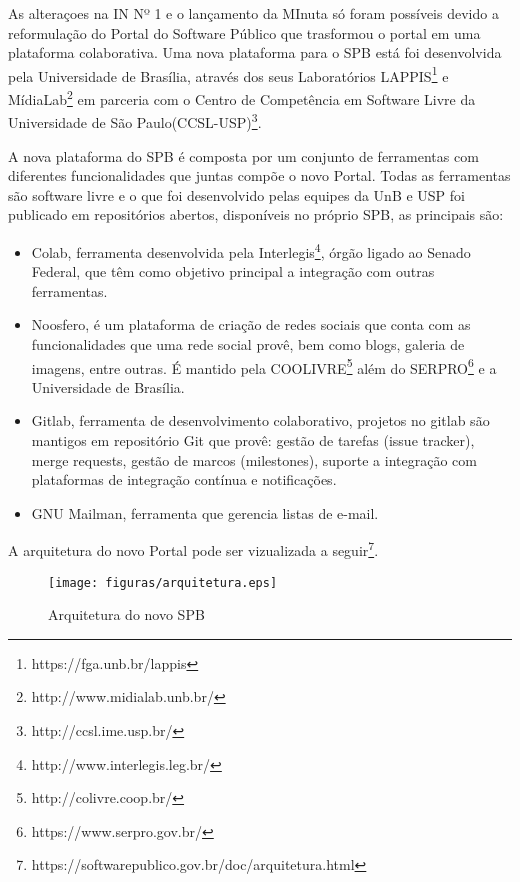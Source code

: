 As alteraçoes na IN Nº 1 e o lançamento da MInuta só foram possíveis devido 
a reformulação do Portal do Software Público que trasformou o portal em uma 
plataforma colaborativa. Uma nova plataforma para o SPB está foi desenvolvida
pela Universidade de Brasília, através dos seus Laboratórios LAPPIS\footnote{https://fga.unb.br/lappis} 
e MídiaLab\footnote{http://www.midialab.unb.br/} 
em parceria com o Centro de Competência em Software Livre da Universidade de São Paulo(CCSL-USP)\footnote{http://ccsl.ime.usp.br/}.

A nova plataforma do SPB é composta por um conjunto de ferramentas com diferentes funcionalidades
que juntas compõe o novo Portal. Todas as ferramentas são software livre e o que foi desenvolvido pelas equipes da UnB e 
USP foi publicado em repositórios abertos, disponíveis no próprio SPB, as principais são:
\begin{itemize}

\item Colab, ferramenta desenvolvida pela Interlegis\footnote{http://www.interlegis.leg.br/}, órgão ligado 
ao Senado Federal, que têm como objetivo principal a integração com outras ferramentas.

\item Noosfero, é um plataforma de criação de redes sociais que conta com as funcionalidades
que uma rede social provê, bem como blogs, galeria de imagens, entre outras. É mantido pela 
COOLIVRE\footnote{http://colivre.coop.br/} além do SERPRO\footnote{https://www.serpro.gov.br/} e a 
Universidade de Brasília.

\item Gitlab, ferramenta de desenvolvimento colaborativo, projetos no gitlab são mantigos em 
repositório Git que provê: gestão de tarefas (issue tracker), merge requests, 
gestão de marcos (milestones), suporte a integração com plataformas de integração contínua e notificações.

\item GNU Mailman, ferramenta que gerencia listas de e-mail.

\end{itemize}

A arquitetura do novo Portal pode ser vizualizada a seguir\footnote{https://softwarepublico.gov.br/doc/arquitetura.html}.

\begin{figure}[h]
	\centering
	\label{arquitetura}
		\texttt{[image: figuras/arquitetura.eps]}
	\caption{Arquitetura do novo SPB}
\end{figure}


